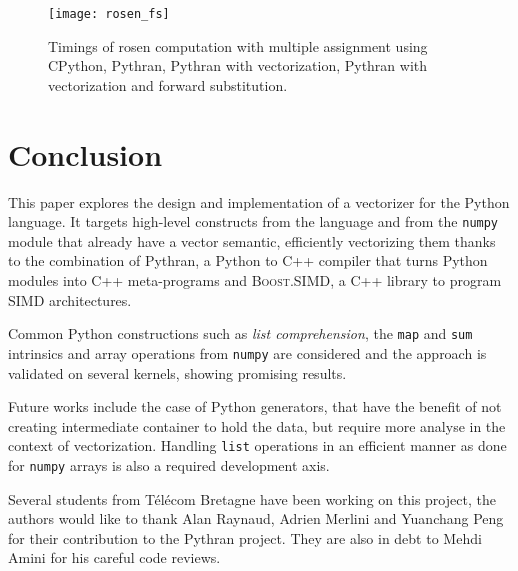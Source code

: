 \documentclass[10pt]{sigplanconf}
\providecommand{\boostsimd}{\textsc{Boost.SIMD}}
\begin{document}
\begin{figure}[ht]

    \texttt{[image: rosen\_fs]}
    \caption{Timings of rosen computation with multiple assignment using CPython, Pythran, Pythran with vectorization, Pythran with vectorization and forward substitution.}
    \label{fig:numpy-code-fs}

\end{figure}

\section*{Conclusion}

This paper explores the design and implementation of a vectorizer for the
Python language. It targets high-level constructs from the language and from
the \texttt{numpy} module that already have a vector semantic, efficiently
vectorizing them thanks to the combination of Pythran, a Python to C++ compiler
that turns Python modules into C++ meta-programs and \boostsimd, a C++ library
to program SIMD architectures.

Common Python constructions such as \emph{list comprehension}, the \texttt{map}
and \texttt{sum} intrinsics and array operations from \texttt{numpy} are
considered and the approach is validated on several kernels, showing
promising results.

Future works include the case of Python generators, that have the benefit of not
creating intermediate container to hold the data, but require more analyse in
the context of vectorization. Handling \texttt{list} operations in an efficient
manner as done for \texttt{numpy} arrays is also a required development axis.

\acks

Several students from T{\'e}l{\'e}com Bretagne have been working on this project, the
authors would like to thank Alan Raynaud, Adrien Merlini and Yuanchang Peng for
their contribution to the Pythran project. They are also in debt to Mehdi
Amini for his careful code reviews.





\end{document}
